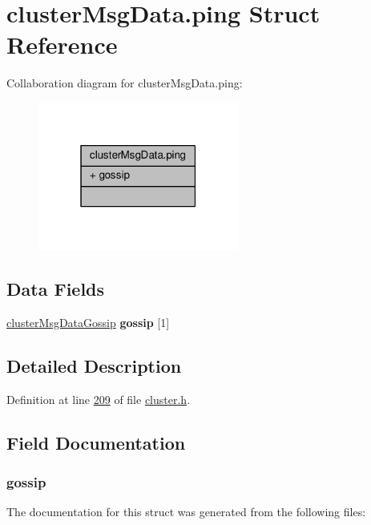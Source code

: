 \hypertarget{structclusterMsgData_8ping}{}\section{cluster\+Msg\+Data.\+ping Struct Reference}
\label{structclusterMsgData_8ping}


Collaboration diagram for cluster\+Msg\+Data.\+ping\+:\nopagebreak
\begin{figure}[H]
\begin{center}
\leavevmode
\includegraphics[width=187pt]{structclusterMsgData_8ping__coll__graph}
\end{center}
\end{figure}
\subsection*{Data Fields}
\begin{DoxyCompactItemize}
\item 
\mbox{\label{structclusterMsgData_8ping_a9c226c311c450e8f0a4ca6a8430721c8}} 
\hyperlink{structclusterMsgDataGossip}{cluster\+Msg\+Data\+Gossip} {\bfseries gossip} \mbox{[}1\mbox{]}
\end{DoxyCompactItemize}


\subsection{Detailed Description}


Definition at line \hyperlink{cluster_8h_source_l00209}{209} of file \hyperlink{cluster_8h_source}{cluster.\+h}.



\subsection{Field Documentation}
\mbox{\label{structclusterMsgData_8ping_a9c226c311c450e8f0a4ca6a8430721c8}} 
\subsubsection{\texorpdfstring{gossip}{gossip}}
{\footnotesize\ttfamily }



The documentation for this struct was generated from the following files\+: